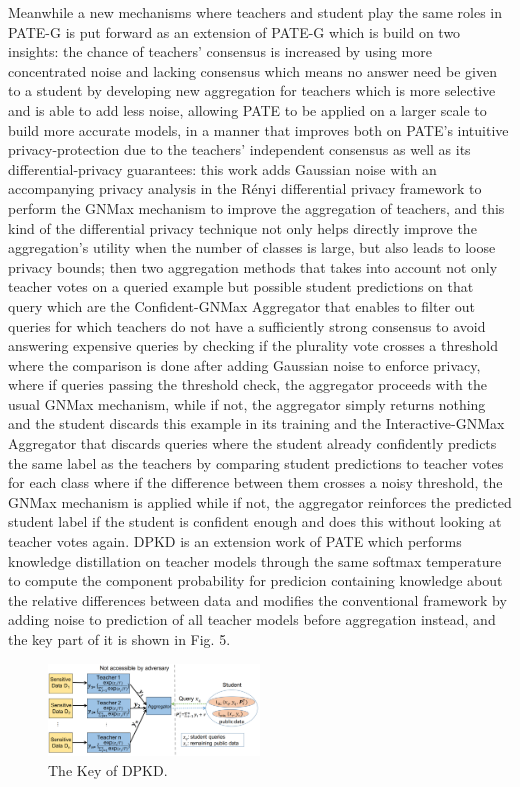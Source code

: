 \documentclass[conference]{IEEEtran}
\begin{document}
Meanwhile a new mechanisms\cite{b24} where teachers and student play the same roles in PATE-G is put forward as an extension of PATE-G which is build on two insights: the chance of teachers' consensus is increased by using more concentrated noise and lacking consensus which means no answer need be given to a student by developing new aggregation for teachers which is more selective and is able to add less noise, allowing PATE to be applied on a larger scale to build more accurate models, in a manner that improves both on PATE’s intuitive privacy-protection due to the teachers’ independent consensus as well as its differential-privacy guarantees: this work adds Gaussian noise with an accompanying privacy analysis in the Rényi differential privacy framework to perform the GNMax mechanism to improve the aggregation of teachers, and this kind of the differential privacy technique not only helps directly improve the aggregation’s utility when the number of classes is large, but also leads to loose privacy bounds; then two aggregation methods that takes into account not only teacher votes on a queried example but possible student predictions on that query which are the Confident-GNMax Aggregator that enables to filter out queries for which teachers do not have a sufficiently strong consensus to avoid answering expensive queries by checking if the plurality vote crosses a threshold where the comparison is done after adding Gaussian noise to enforce privacy, where if queries passing the threshold check, the aggregator proceeds with the usual GNMax mechanism, while if not, the aggregator simply returns nothing and the student discards this example in its training and the Interactive-GNMax Aggregator that discards queries where the student already confidently predicts the same label as the teachers by comparing student predictions to teacher votes for each class where if the difference between them crosses a noisy threshold, the GNMax mechanism is applied while if not, the aggregator reinforces the predicted student label if the student is confident enough and does this without looking at teacher votes again. DPKD\cite{b25} is an extension work of PATE which performs knowledge distillation on teacher models through the same softmax temperature to compute the component probability for predicion containing knowledge about the relative differences between data and modifies the conventional framework by adding noise to prediction of all teacher models before aggregation instead, and the key part of it is shown in Fig. 5. 
\begin{figure}[htbp]
    \centerline{\includegraphics[width=0.5\textwidth,height=0.2\textwidth]{DPKD.png}}
    \caption{The Key of DPKD.}
    \label{fig5}
\end{figure}
\end{document}
